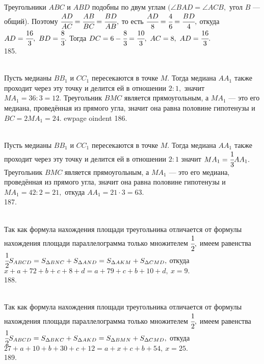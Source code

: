 Треугольники $ABC$ и $ABD$ подобны по двум углам $(\angle BAD = \angle ACB,$ угол $B$ --- общий). Поэтому $\cfrac{AD}{AC}=\cfrac{AB}{BC}=\cfrac{BD}{AB},$ то есть
$\cfrac{AD}{8}=\cfrac{4}{6}=\cfrac{BD}{4},$ откуда $AD=\cfrac{16}{3},\ BD=\cfrac{8}{3}.$ Тогда $DC=6-\cfrac{8}{3}=\cfrac{10}{3},\ AC=8,\ AD=\cfrac{16}{3}.$\\
185. \begin{figure}[ht!]
\end{figure}\\
Пусть медианы $BB_1$ и $CC_1$ пересекаются в точке $M.$ Тогда медиана $AA_1$ также проходит через эту точку и делится ей в отношении $2:1,$ значит $MA_1=36:3=12.$ Треугольник $BMC$ является прямоугольным, а $MA_1$ --- это его медиана, проведённая из прямого угла, значит она равна половине гипотенузы и $BC=2MA_1=24.$
ewpage
oindent
186. \begin{figure}[ht!]
\end{figure}\\
Пусть медианы $BB_1$ и $CC_1$ пересекаются в точке $M.$ Тогда медиана $AA_1$ также проходит через эту точку и делится ей в отношении $2:1$ значит $MA_1=\cfrac{1}{3}AA_1.$ Треугольник $BMC$ является прямоугольным, а $MA_1$ --- это его медиана, проведённая из прямого угла, значит она равна половине гипотенузы и $MA_1=42:2=21,$ откуда $AA_1=21\cdot3=63.$\\
187. \begin{figure}[ht!]
\end{figure}\\
Так как формула нахождения площади треугольника отличается от формулы нахождения площади параллелограмма только множителем $\cfrac{1}{2},$ имеем равенства
$\cfrac{1}{2}S_{ABCD}=S_{\Delta BNC}+S_{\Delta AND}=S_{\Delta AKM}+S_{\Delta CMD},$ откуда $x+a+72+b+c+8+d=a+79+c+b+10+d,\ x=9.$\\
188. \begin{figure}[ht!]
\end{figure}\\
Так как формула нахождения площади треугольника отличается от формулы нахождения площади параллелограмма только множителем $\cfrac{1}{2},$ имеем равенства
$\cfrac{1}{2}S_{ABCD}=S_{\Delta BKC}+S_{\Delta AKD}=S_{\Delta BMN}+S_{\Delta CMD},$ откуда $27+a+10+b+30+c+12=a+x+c+b+54,\ x=25.$\\
189. \begin{figure}[ht!]
\end{figure}\\
